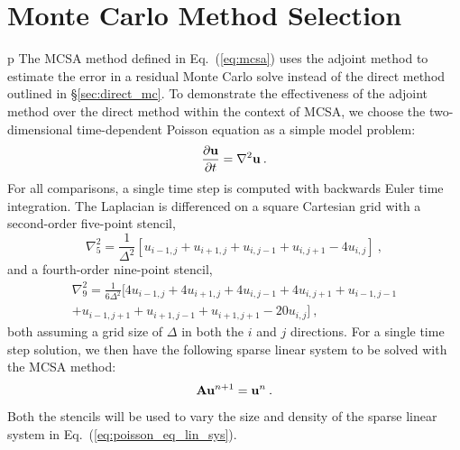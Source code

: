 \section{Monte Carlo Method Selection}
\label{sec:mc_method_selection}p
The MCSA method defined in Eq.~(\ref{eq:mcsa}) uses the adjoint method
to estimate the error in a residual Monte Carlo solve instead of the
direct method outlined in \S\ref{sec:direct_mc}. To demonstrate the
effectiveness of the adjoint method over the direct method within the
context of MCSA, we choose the two-dimensional time-dependent Poisson
equation as a simple model problem:
\begin{equation}
  \frac{\partial \mathbf{u}}{\partial t} = \nabla^2 \mathbf{u}\:.
  \label{eq:poisson_equation}
\end{equation}
For all comparisons, a single time step is computed with backwards Euler time
integration. The Laplacian is differenced on a square Cartesian grid with a
second-order five-point stencil,
\begin{equation}
  \nabla^2_5 = \frac{1}{\Delta^2}[u_{i-1,j} + u_{i+1,j} + u_{i,j-1} +
    u_{i,j+1} - 4 u_{i,j}]\:,
  \label{eq:five_point_stencil}
\end{equation}
and a fourth-order nine-point stencil,
\begin{multline}
  \nabla^2_9 = \frac{1}{6\Delta^2}[4 u_{i-1,j} + 4 u_{i+1,j} + 4
    u_{i,j-1} + 4 u_{i,j+1} + u_{i-1,j-1}\\ + u_{i-1,j+1} +
    u_{i+1,j-1} + u_{i+1,j+1} - 20 u_{i,j}]\:,
  \label{eq:nine_point_stencil}
\end{multline}
both assuming a grid size of $\Delta$ in both the $i$ and $j$ directions. For
a single time step solution, we then have the following sparse linear system
to be solved with the MCSA method:
\begin{equation}
  \mathbf{A} \mathbf{u}^{n+1} = \mathbf{u}^n\:.
  \label{eq:poisson_eq_lin_sys}
\end{equation}
Both the stencils will be used to vary the size and density of the sparse
linear system in Eq.~(\ref{eq:poisson_eq_lin_sys}).


